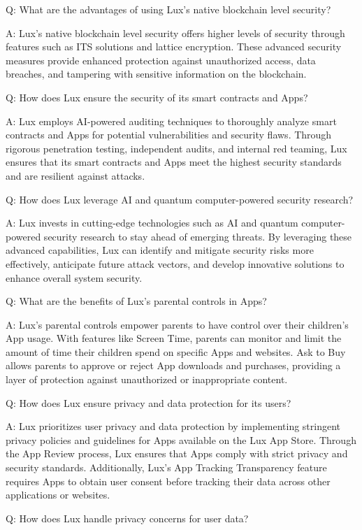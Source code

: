 \documentclass[11pt]{article}
\begin{document}
Q: What are the advantages of using Lux's native blockchain level security?


A: Lux's native blockchain level security offers higher levels of security through features such as ITS solutions and lattice encryption. These advanced security measures provide enhanced protection against unauthorized access, data breaches, and tampering with sensitive information on the blockchain.


Q: How does Lux ensure the security of its smart contracts and Apps?


A: Lux employs AI-powered auditing techniques to thoroughly analyze smart contracts and Apps for potential vulnerabilities and security flaws. Through rigorous penetration testing, independent audits, and internal red teaming, Lux ensures that its smart contracts and Apps meet the highest security standards and are resilient against attacks.


Q: How does Lux leverage AI and quantum computer-powered security research?


A: Lux invests in cutting-edge technologies such as AI and quantum computer-powered security research to stay ahead of emerging threats. By leveraging these advanced capabilities, Lux can identify and mitigate security risks more effectively, anticipate future attack vectors, and develop innovative solutions to enhance overall system security.


Q: What are the benefits of Lux's parental controls in Apps?


A: Lux's parental controls empower parents to have control over their children's App usage. With features like Screen Time, parents can monitor and limit the amount of time their children spend on specific Apps and websites. Ask to Buy allows parents to approve or reject App downloads and purchases, providing a layer of protection against unauthorized or inappropriate content.


Q: How does Lux ensure privacy and data protection for its users?


A: Lux prioritizes user privacy and data protection by implementing stringent privacy policies and guidelines for Apps available on the Lux App Store. Through the App Review process, Lux ensures that Apps comply with strict privacy and security standards. Additionally, Lux's App Tracking Transparency feature requires Apps to obtain user consent before tracking their data across other applications or websites.


Q: How does Lux handle privacy concerns for user data?
\end{document}
